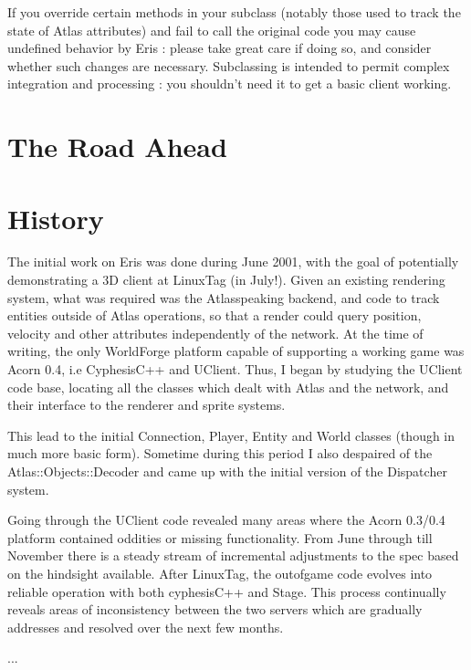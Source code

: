 If you override certain methods in your subclass (notably those used to track the state
of Atlas attributes) and fail to call the original code you may cause undefined behavior
by Eris : please take great care if doing so, and consider whether such changes are
necessary. Subclassing is intended to permit complex integration and processing : you
shouldn't need it to get a basic client working. 



\section{The Road Ahead}







\section{History} 



The initial work on Eris was done during June 2001, with the goal of potentially demonstrating
a 3D client at LinuxTag (in July!). Given an existing rendering system, what was
required was the Atlasspeaking backend, and code to track entities outside of Atlas
operations, so that a render could query position, velocity and other attributes independently
of the network. At the time of writing, the only WorldForge platform capable of supporting a
working game was Acorn 0.4, i.e CyphesisC++ and UClient. Thus, I began by studying the UClient
code base, locating all the classes which dealt with Atlas and the network, and their
interface to the renderer and sprite systems.



This lead to the initial Connection, Player, Entity and World classes (though in much more
basic form). Sometime during this period I also despaired of the Atlas::Objects::Decoder and
came up with the initial version of the Dispatcher system.



Going through the UClient code revealed many areas where the Acorn 0.3/0.4 platform contained oddities
or missing functionality. From June through till November there is a steady stream of
incremental adjustments to the spec based on the hindsight available. After LinuxTag, the
outofgame code evolves into reliable operation with
both cyphesisC++ and Stage. This process continually reveals areas of inconsistency
between the two servers which are gradually addresses and resolved over the next few months.



...






